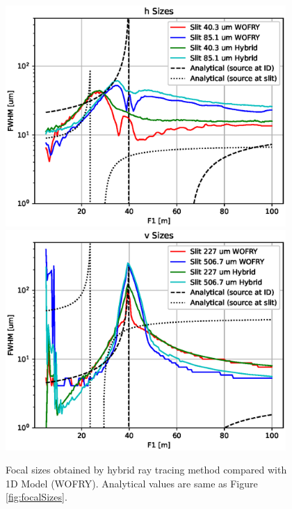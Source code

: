 \documentclass{iucr}              %
\newcommand{\ingreen}[1]{{\color{green}#1}}
\begin{document}
\begin{figure}
    \centering
    
    \includegraphics[width=0.95\textwidth]{figures/sizes_h_hybrid.eps}
    \includegraphics[width=0.95\textwidth]{figures/sizes_v_hybrid.eps}
        
    \caption{Focal sizes obtained by hybrid ray tracing method compared with 1D Model (WOFRY). Analytical values are same as Figure \ref{fig:focalSizes}. 
    }
    \label{fig:focalSizes_hybrid}
\end{figure}
\end{document}
